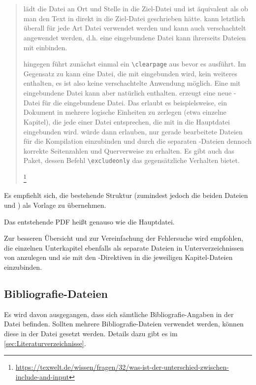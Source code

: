 \begin{quote}
{\small
\verb++ lädt die Datei an Ort und Stelle in die Ziel-Datei und ist äquivalent
als ob man den Text in  direkt in die Ziel-Datei geschrieben hätte.
\verb++ kann letztlich überall für jede Art Datei verwendet werden und kann auch verschachtelt angewendet werden,
d.h. eine eingebundene Datei kann ihrerseits Dateien mit \verb++ einbinden.

\verb++ hingegen führt zunächst einmal ein \verb+\clearpage+ aus bevor es \verb++ ausführt.
Im Gegensatz zu \verb++ kann eine Datei, die mit \verb++ eingebunden wird,
kein weiteres \verb++ enthalten, es ist also keine verschachtelte Anwendung möglich.
Eine mit \verb++ eingebundene Datei kann aber natürlich \verb++ enthalten.
\verb++ erzeugt eine neue -Datei für die eingebundene Datei.
Das erlaubt es beispielsweise, ein Dokument in mehrere logische Einheiten zu zerlegen (etwa einzelne Kapitel),
die jede einer Datei entsprechen, die mit \verb++ in die Hauptdatei eingebunden wird.
\verb++ würde dann erlauben, nur gerade bearbeitete Dateien für die Kompilation einzubinden
und durch die separaten -Dateien dennoch korrekte Seitenzahlen und Querverweise zu erhalten.
Es gibt auch das  Paket, dessen Befehl \verb+\excludeonly+ das gegensätzliche Verhalten bietet.%
}%
\footnote{\url{https://texwelt.de/wissen/fragen/32/was-ist-der-unterschied-zwischen-include-and-input}}
\end{quote}

Es empfiehlt sich, die bestehende Struktur (zumindest jedoch die beiden Dateien
 und )
als Vorlage zu übernehmen.

Das entstehende PDF heißt genauso wie die Hauptdatei.

Zur besseren Übersicht und zur Vereinfachung der Fehlersuche wird empfohlen,
die einzelnen Unterkapitel ebenfalls als separate Dateien in Unterverzeichnissen von  anzulegen
und sie mit den \verb++-Direktiven in die jeweiligen Kapitel-Dateien einzubinden.



\subsection[Bibliografie-Dateien]{Bibliografie-Dateien}%
%
\label{sec:Bibliografie}
%
Es wird davon ausgegangen, dass sich sämtliche Bibliografie-Angaben in der Datei
 befinden.
Sollten mehrere Bibliografie-Dateien verwendet werden, können diese in der Datei
 gesetzt werden.
Details dazu gibt es im \cref{sec:Literaturverzeichnisse}.

